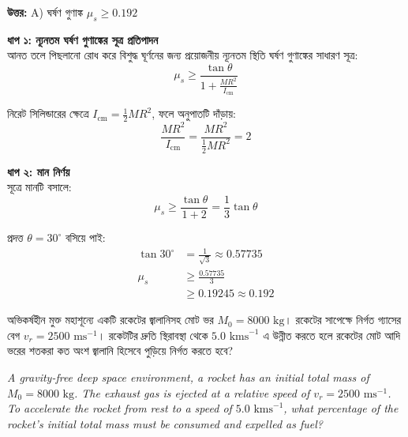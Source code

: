 \documentclass[12pt, a4paper]{article}
\begin{document}
\vspace{0.5em}
\begin{tcolorbox}[answerbox]
    \textbf{\color{success} উত্তর:} A) ঘর্ষণ গুণাঙ্ক $\mu_s \ge 0.192$
\end{tcolorbox}
\vspace{1em}

\begin{tcolorbox}[solutionbox={সমাধান (Solution)}]
    \noindent
    \textbf{ধাপ ১: ন্যূনতম ঘর্ষণ গুণাঙ্কের সূত্র প্রতিপাদন} \\
    আনত তলে পিছলানো রোধ করে বিশুদ্ধ ঘূর্ণনের জন্য প্রয়োজনীয় ন্যূনতম স্থিতি ঘর্ষণ গুণাঙ্কের সাধারণ সূত্র:
    \[ \mu_s \ge \frac{\tan\theta}{1 + \frac{M R^2}{I_{\text{cm}}}} \]
    
    নিরেট সিলিন্ডারের ক্ষেত্রে $I_{\text{cm}} = \frac{1}{2} M R^2$, ফলে অনুপাতটি দাঁড়ায়:
    \[ \frac{M R^2}{I_{\text{cm}}} = \frac{M R^2}{\frac{1}{2} M R^2} = 2 \]
    
    \vspace{0.5em}
    \noindent\textbf{ধাপ ২: মান নির্ণয়} \\
    সূত্রে মানটি বসালে:
    \[ \mu_s \ge \frac{\tan\theta}{1 + 2} = \frac{1}{3} \tan\theta \]
    
    প্রদত্ত $\theta = 30^\circ$ বসিয়ে পাই:
    \begin{align*}
        \tan 30^\circ &= \frac{1}{\sqrt{3}} \approx 0.57735 \\
        \mu_s &\ge \frac{0.57735}{3} \\
              &\ge \mathbf{0.19245} \approx \mathbf{0.192}
    \end{align*}
\end{tcolorbox}

\newpage

\begin{tcolorbox}[questionbox={প্রশ্ন (Question) 50}]
    \noindent
    অভিকর্ষহীন মুক্ত মহাশূন্যে একটি রকেটের জ্বালানিসহ মোট ভর $M_0 = 8000\text{ kg}$। রকেটের সাপেক্ষে নির্গত গ্যাসের বেগ $v_r = 2500\text{ ms}^{-1}$। রকেটটির দ্রুতি স্থিরাবস্থা থেকে $5.0\text{ kms}^{-1}$ এ উন্নীত করতে হলে রকেটের মোট আদি ভরের শতকরা কত অংশ জ্বালানি হিসেবে পুড়িয়ে নির্গত করতে হবে?
    
    \vspace{0.8em}
    \begin{english}
    \noindent\textit{\color{darkgray}
    A gravity-free deep space environment, a rocket has an initial total mass of $M_0 = 8000\text{ kg}$. The exhaust gas is ejected at a relative speed of $v_r = 2500\text{ ms}^{-1}$. To accelerate the rocket from rest to a speed of $5.0\text{ kms}^{-1}$, what percentage of the rocket's initial total mass must be consumed and expelled as fuel?
    }
    \end{english}
\end{tcolorbox}
\end{document}
